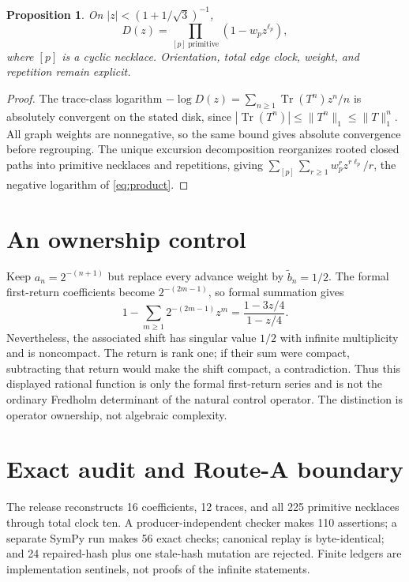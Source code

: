 \documentclass[11pt]{article}
\newtheorem{proposition}{Proposition}
\newcommand{\Tr}{\operatorname{Tr}}
\begin{document}
\begin{proposition}\label{prop:product}
On $|z|<(1+1/\sqrt3)^{-1}$,
\begin{equation}\label{eq:product}
 D(z)=\prod_{[p]\ \mathrm{primitive}}(1-w_pz^{\ell_p}),
\end{equation}
where $[p]$ is a cyclic necklace.  Orientation, total edge clock, weight,
and repetition remain explicit.
\end{proposition}
\begin{proof}
The trace-class logarithm
$-\log D(z)=\sum_{n\ge1}\Tr(T^n)z^n/n$ is absolutely convergent on the
stated disk, since
$|\Tr(T^n)|\le\lVert T^n\rVert_1\le\lVert T\rVert_1^n$.
All graph weights are nonnegative, so the same bound gives absolute
convergence before regrouping.  The unique excursion decomposition
reorganizes rooted closed
paths into primitive necklaces and repetitions, giving
$\sum_{[p]}\sum_{r\ge1}w_p^rz^{r\ell_p}/r$, the negative logarithm of
\eqref{eq:product}.
\end{proof}

\section{An ownership control}
Keep $a_n=2^{-(n+1)}$ but replace every advance weight by
$\widetilde b_n=1/2$.  The formal first-return coefficients become
$2^{-(2m-1)}$, so formal summation gives
\[
 1-\sum_{m\ge1}2^{-(2m-1)}z^m
 =\frac{1-3z/4}{1-z/4}.
\]
Nevertheless, the associated shift has singular value $1/2$ with infinite
multiplicity and is noncompact.  The return is rank one; if their sum were
compact, subtracting that return would make the shift compact, a
contradiction.  Thus this displayed rational function is only the formal
first-return series and is not the ordinary Fredholm determinant of the
natural control operator.  The distinction is operator ownership, not
algebraic complexity.

\section{Exact audit and Route-A boundary}
The release reconstructs 16 coefficients, 12 traces, and all 225 primitive
necklaces through total clock ten.  A producer-independent checker makes 110
assertions; a separate SymPy run makes 56 exact checks; canonical replay is
byte-identical; and 24 repaired-hash plus one stale-hash mutation are
rejected.  Finite ledgers are implementation sentinels, not proofs of the
infinite statements.
\end{document}

